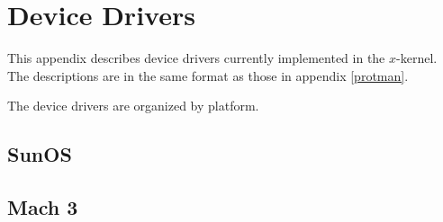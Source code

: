 %     
%
%
%
%
%

\section{Device Drivers}
\label{driverman}

This appendix describes device drivers currently implemented in
the $x$-kernel. The descriptions are in the same format as those in
appendix \ref{protman}. 

The device drivers are organized by \xk{} platform.

\subsection{SunOS}



\newpage{}
\subsection{Mach 3}



\newpage{}


\newpage{}


